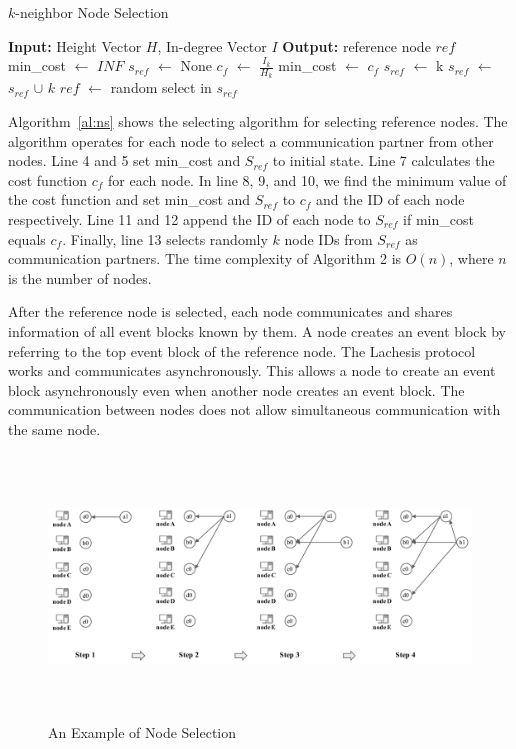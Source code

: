 \documentclass{article}
\begin{document}
\begin{algorithm}
\caption{$k$-neighbor Node Selection}\label{al:ns}
\begin{algorithmic}[1]
	\State \textbf{Input:} Height Vector $H$, In-degree Vector $I$
	\State \textbf{Output:} reference node $ref$
	\State min\_cost $\leftarrow$ $INF$ 
	\State $s_{ref}$ $\leftarrow$ None
	\State $c_f$ $\leftarrow$ $\frac{I_k}{H_k}$ 
	\State min\_cost $\leftarrow$ $c_f$
	\State $s_{ref}$ $\leftarrow$ {k}
	\State $s_{ref}$ $\leftarrow$ $s_{ref}$ $\cup$ $k$
	\EndIf
	\EndFor
	\State $ref$ $\leftarrow$ random select in $s_{ref}$
	\EndProcedure
\end{algorithmic}
\end{algorithm}
\newpage
Algorithm~\ref{al:ns} shows the selecting algorithm for selecting reference nodes. The algorithm operates for each node to select a communication partner from other nodes. Line 4 and 5 set min\_cost and $S_{ref}$ to initial state. Line 7 calculates the cost function $c_f$ for each node. In line 8, 9, and 10, we find the minimum value of the cost function and set min\_cost and $S_{ref}$ to $c_f$ and the ID of each node respectively. Line 11 and 12 append the ID of each node to $S_{ref}$ if min\_cost equals $c_f$. Finally, line 13 selects randomly $k$ node IDs from $S_{ref}$ as communication partners. The time complexity of Algorithm 2 is $O(n)$, where $n$ is the number of nodes. 

After the reference node is selected, each node communicates and shares information of all event blocks known by them. A node creates an event block by referring to the top event block of the reference node. The Lachesis protocol works and communicates asynchronously. This allows a node to create an event block asynchronously even when another node creates an event block. The communication between nodes does not allow simultaneous communication with the same node. 

\begin{figure}[h] \centering  
\includegraphics[height=7cm, width=1.0\columnwidth]{node_selection.pdf}
\caption{An Example of Node Selection}
\label{fig:node_selection}
\end{figure}
\end{document}
